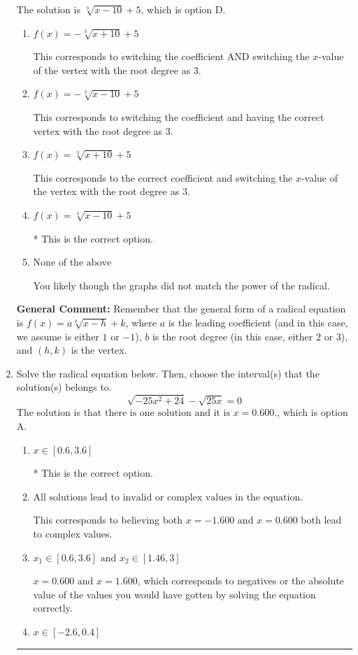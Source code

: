 \documentclass{extbook}[14pt]
\newcommand{\litem}[1]{\item #1

\rule{\textwidth}{0.4pt}}
\begin{document}
\begin{enumerate}
{The solution is \( \sqrt[3]{x - 10} + 5 \), which is option D.\begin{enumerate}[label=\Alph*.]
\item \( f(x) = - \sqrt[3]{x + 10} + 5 \)

This corresponds to switching the coefficient AND switching the $x$-value of the vertex with the root degree as $3$.
\item \( f(x) = - \sqrt[3]{x - 10} + 5 \)

This corresponds to switching the coefficient and having the correct vertex with the root degree as $3$.
\item \( f(x) = \sqrt[3]{x + 10} + 5 \)

This corresponds to the correct coefficient and switching the $x$-value of the vertex with the root degree as $3$.
\item \( f(x) = \sqrt[3]{x - 10} + 5 \)

* This is the correct option.
\item \( \text{None of the above} \)

You likely though the graphs did not match the power of the radical.
\end{enumerate}

\textbf{General Comment:} Remember that the general form of a radical equation is $ f(x) = a \sqrt[b]{x - h} + k$, where $a$ is the leading coefficient (and in this case, we assume is either $1$ or $-1$), $b$ is the root degree (in this case, either $2$ or $3$), and $(h, k)$ is the vertex.
}
\litem{
Solve the radical equation below. Then, choose the interval(s) that the solution(s) belongs to.
\[ \sqrt{-25 x^2 + 24} - \sqrt{25 x} = 0 \]
The solution is \( \text{that there is one solution and it is } x = 0.600. \), which is option A.\begin{enumerate}[label=\Alph*.]
\item \( x \in [0.6,3.6] \)

* This is the correct option.
\item \( \text{All solutions lead to invalid or complex values in the equation.} \)

This corresponds to believing both $x = -1.600 \text{ and } x = 0.600$ both lead to complex values.
\item \( x_1 \in [0.6, 3.6] \text{ and } x_2 \in [1.46,3] \)

$x = 0.600 \text{ and } x = 1.600$, which corresponds to negatives or the absolute value of the values you would have gotten by solving the equation correctly.
\item \( x \in [-2.6,0.4] \)


\end{enumerate}}
\end{enumerate}
\end{document}
